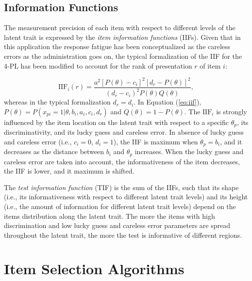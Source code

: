 \documentclass{svproc}
\begin{document}
\subsection{Information Functions}

The measurement precision of each item with respect to different levels of the latent trait is expressed by the \emph{item information functions} (IIFs). 
Given that in this application the response fatigue has been conceptualized as the careless errors as the administration goes on, the typical formalization of the IIF for the 4-PL \cite{magis:iif} has been modified to account for the rank of presentation $r$ of item $i$:


\begin{equation}\label{eq:iif}
	\text{IIF}_{i}(r) = \dfrac{a^2[P(\theta)-c_i]^2[d_r - P(\theta)]^2}{(d_{r}-c_i)^2 P(\theta)Q(\theta)}, 
\end{equation}
whereas in the typical formalization $d_r = d_i$. In Equation (\ref{eq:iif}), $P(\theta) = P(x_{pi}=1|\theta, b_i, a_i, c_i, d_r)$  and $Q(\theta) = 1- P(\theta)$.
The $\text{IIF}_i$ is strongly influenced by the item location on the latent trait with respect to a specific $\theta_p$, its discriminativity, and its lucky guess and careless error. In absence of lucky guess and careless error (i.e., $c_i = 0$, $d_i = 1$), the IIF is maximum when  $\theta_p = b_i$, and it decreases as the distance between $b_i$ and $\theta_p$ increases. When the lucky guess and careless error are taken into account, the informativeness of the item decreases, the IIF is lower, and it maximum is shifted. 

The \emph{test information function} (TIF) is the sum of the IIFs, such that its shape (i.e., its informativeness with respect to different latent trait levels) and its height (i.e., the amount of information for different latent trait levels) depend on the items distribution along the latent trait. The more the items with high discrimination and low lucky guess and careless error parameters are spread throughout the latent trait, the more the test is informative of different regions. 


\section{Item Selection Algorithms}
\end{document}
